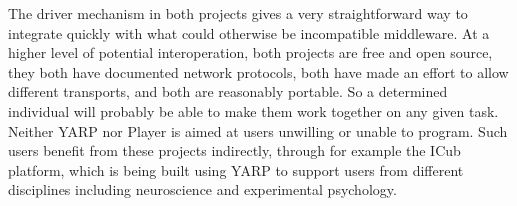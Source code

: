 The driver mechanism in both projects gives a very straightforward way
to integrate quickly with what could otherwise be incompatible
middleware.
%
At a higher level of potential interoperation, both projects are free
and open source, they both have documented network protocols, both have
made an effort to allow different transports, and both 
are reasonably portable.  So
a determined individual will probably be able to make them work
together on any given task.
%
Neither YARP nor Player is aimed at users unwilling or unable to
program.  Such users benefit from these projects indirectly, through
for example the ICub platform, which is being built using YARP to
support users from different disciplines including neuroscience
and experimental psychology.










